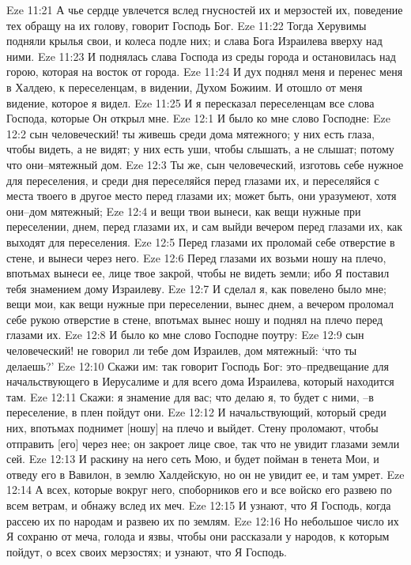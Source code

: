 Eze 11:21  А чье сердце увлечется вслед гнусностей их и мерзостей их, поведение тех обращу на их голову, говорит Господь Бог.
Eze 11:22  Тогда Херувимы подняли крылья свои, и колеса подле них; и слава Бога Израилева вверху над ними.
Eze 11:23  И поднялась слава Господа из среды города и остановилась над горою, которая на восток от города.
Eze 11:24  И дух поднял меня и перенес меня в Халдею, к переселенцам, в видении, Духом Божиим. И отошло от меня видение, которое я видел.
Eze 11:25  И я пересказал переселенцам все слова Господа, которые Он открыл мне.
Eze 12:1  И было ко мне слово Господне:
Eze 12:2  сын человеческий! ты живешь среди дома мятежного; у них есть глаза, чтобы видеть, а не видят; у них есть уши, чтобы слышать, а не слышат; потому что они--мятежный дом.
Eze 12:3  Ты же, сын человеческий, изготовь себе нужное для переселения, и среди дня переселяйся перед глазами их, и переселяйся с места твоего в другое место перед глазами их; может быть, они уразумеют, хотя они--дом мятежный;
Eze 12:4  и вещи твои вынеси, как вещи нужные при переселении, днем, перед глазами их, и сам выйди вечером перед глазами их, как выходят для переселения.
Eze 12:5  Перед глазами их проломай себе отверстие в стене, и вынеси через него.
Eze 12:6  Перед глазами их возьми ношу на плечо, впотьмах вынеси ее, лице твое закрой, чтобы не видеть земли; ибо Я поставил тебя знамением дому Израилеву.
Eze 12:7  И сделал я, как повелено было мне; вещи мои, как вещи нужные при переселении, вынес днем, а вечером проломал себе рукою отверстие в стене, впотьмах вынес ношу и поднял на плечо перед глазами их.
Eze 12:8  И было ко мне слово Господне поутру:
Eze 12:9  сын человеческий! не говорил ли тебе дом Израилев, дом мятежный: `что ты делаешь?'
Eze 12:10  Скажи им: так говорит Господь Бог: это--предвещание для начальствующего в Иерусалиме и для всего дома Израилева, который находится там.
Eze 12:11  Скажи: я знамение для вас; что делаю я, то будет с ними, --в переселение, в плен пойдут они.
Eze 12:12  И начальствующий, который среди них, впотьмах поднимет [ношу] на плечо и выйдет. Стену проломают, чтобы отправить [его] через нее; он закроет лице свое, так что не увидит глазами земли сей.
Eze 12:13  И раскину на него сеть Мою, и будет пойман в тенета Мои, и отведу его в Вавилон, в землю Халдейскую, но он не увидит ее, и там умрет.
Eze 12:14  А всех, которые вокруг него, споборников его и все войско его развею по всем ветрам, и обнажу вслед их меч.
Eze 12:15  И узнают, что Я Господь, когда рассею их по народам и развею их по землям.
Eze 12:16  Но небольшое число их Я сохраню от меча, голода и язвы, чтобы они рассказали у народов, к которым пойдут, о всех своих мерзостях; и узнают, что Я Господь.
